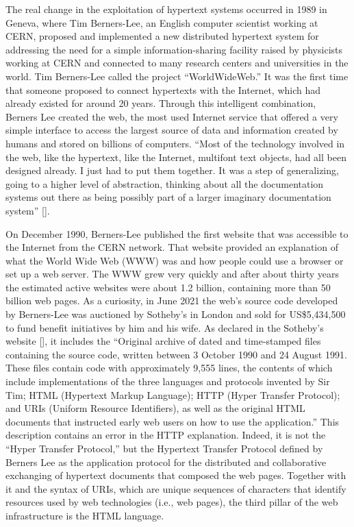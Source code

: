The real change in the exploitation of hypertext systems occurred in 1989 in Geneva, where Tim Berners-Lee, an English computer scientist working at CERN, proposed and implemented a new distributed hypertext system for addressing the need for a simple information-sharing facility raised by physicists working at CERN and connected to many research centers and universities in the world. Tim Berners-Lee called the project ``WorldWideWeb.'' It was the first time that someone proposed to connect hypertexts with the Internet, which had already existed for around 20 years. Through this intelligent combination, Berners Lee created the web, the most used Internet service that offered a very simple interface to access the largest source of data and information created by humans and stored on billions of computers. ``Most of the technology involved in the web, like the hypertext, like the Internet, multifont text objects, had all been designed already. I just had to put them together. It was a step of generalizing, going to a higher level of abstraction, thinking about all the documentation systems out there as being possibly part of a larger imaginary documentation system'' [\citealt{chap:3:Berners-Lee:1990}].

On December 1990, Berners-Lee published the first website that was accessible to the Internet from the\vadjust{\vspace*{12pt}\pagebreak} CERN network. That website provided an explanation of what the World Wide Web (WWW) was and how people could use a browser or set up a web server. The WWW grew very quickly and after about thirty years the estimated active websites were about 1.2 billion, containing more than 50 billion web pages. As a curiosity, in June 2021 the web's source code developed by Berners-Lee was auctioned by Sotheby's in London and sold for US\$5,434,500 to fund benefit initiatives by him and his wife. As declared in the Sotheby's website [\citealt{chap:3:Sotheby:2021}], it includes the ``Original archive of dated and time-stamped files containing the source code, written between 3 October 1990 and 24 August 1991. These files contain code with approximately 9,555 lines, the contents of which include implementations of the three languages and protocols invented by Sir Tim; HTML (Hypertext Markup Language); HTTP (Hyper Transfer Protocol); and URIs (Uniform Resource Identifiers), as well as the original HTML documents that instructed early web users on how to use the application.'' This description contains an error in the HTTP explanation. Indeed, it is not the ``Hyper Transfer Protocol,'' but the Hypertext Transfer Protocol defined by Berners Lee as the application protocol for the distributed and collaborative exchanging of hypertext documents that composed the web pages. Together with it and the syntax of URIs, which are unique sequences of characters that identify resources used by web technologies (i.e., web pages), the third pillar of the web infrastructure is the HTML language.

